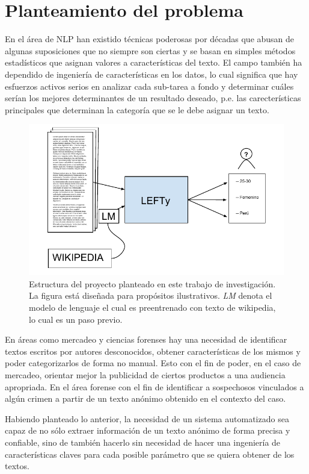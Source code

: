 \section{Planteamiento del problema}

En el área de NLP han existido técnicas poderosas por décadas que abusan de algunas suposiciones que no siempre son ciertas y se basan en simples métodos estadísticos que asignan valores a características del texto. El campo también ha dependido de ingeniería de características en los datos, lo cual significa que hay esfuerzos activos serios en analizar cada sub-tarea a fondo y determinar cuáles serían los mejores determinantes de un resultado deseado, p.e. las carecterísticas principales que determinan la categoría que se le debe asignar un texto.

\begin{figure}
\includegraphics[scale=1.0]{Figures/projectstruct.pdf}
\caption{Estructura del proyecto planteado en este trabajo de investigación. La figura está diseñada para propósitos ilustrativos. \textit{LM} denota el modelo de lenguaje el cual es preentrenado con texto de wikipedia, lo cual es un paso previo.}
\label{fig:projstruct}
\end{figure}

En áreas como mercadeo y ciencias forenses hay una necesidad de identificar textos escritos por autores desconocidos, obtener características de los mismos y poder categorizarlos de forma no manual. Esto con el fin de poder, en el caso de mercadeo, orientar mejor la publicidad de ciertos productos a una audiencia apropriada. En el área forense con el fin de identificar a sospechosos vinculados a algún crimen a partir de un texto anónimo obtenido en el contexto del caso.

Habiendo planteado lo anterior, la necesidad de un sistema automatizado sea capaz de no sólo extraer información de un texto anónimo de forma precisa y confiable, sino de también hacerlo sin necesidad de hacer una ingeniería de características claves para cada posible parámetro que se quiera obtener de los textos.

